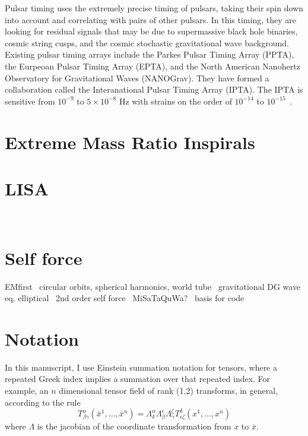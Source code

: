 Pulsar timing uses the extremely precise timing of pulsars, taking their spin down into account and correlating with pairs of other pulsars. In this timing, they are looking for residual signals that may be due to supermassive black hole binaries, cosmic string cusps, and the cosmic stochastic gravitational wave background. Existing pulsar timing arrays include the Parkes Pulsar Timing Array (PPTA), the Eurpeoan Pulsar Timing Array (EPTA), and the North American Nanohertz Observatory for Gravitational Waves (NANOGrav). They have formed a collaboration called the Interanational Pulsar Timing Array (IPTA). The IPTA is sensitive from $10^{-9}$ to $5\times10^{-8}$ Hz with strains on the order of $10^{-14}$ to $10^{-15}$~\cite{hobbs_dai}.










\section{Extreme Mass Ratio Inspirals}
\section{LISA}
~\cite{LISA02062017}
~\cite{LISAscienceMarch28_2017}
~\cite{ELISAz}
~\cite{eLISAastrophysicsSelfForce}
\section{Self force}
EMfirst~\cite{dirac1938}
circular orbits, spherical harmonics, world tube~\cite{wardell_vega_thornberg_diener}
gravitational DG wave eq, elliptical~\cite{time_dependent_coordinate_transform}
2nd order self force~\cite{pound2ndOrderSelfForce0}
MiSaTaQuWa?~\cite{minosasakitanaka}
basis for code~\cite{heffernan_ottewil_wardell_modesum_basisForCode}



\section{Notation}
In this manuscript, I use Einstein summation notation for tensors, where a repeated Greek index implies a summation over that repeated index. For example, an $n$ dimensional tensor field of rank (1,2) transforms, in general, according to the rule
\begin{equation}
  T^\alpha_{\beta\gamma}(\bar{x}^1,\ldots,\bar{x}^n)=\Lambda^\alpha_\delta\Lambda^\epsilon_\beta\Lambda^\zeta_\gamma T^\delta_{\epsilon\zeta}(x^1,\ldots,x^n)
\end{equation}
where $\Lambda$ is the jacobian of the coordinate transformation from $x$ to $\bar{x}$. 

